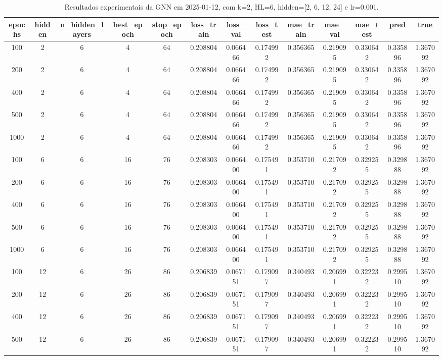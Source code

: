 \begin{table}[h]
\centering
\caption{Resultados experimentais da GNN em 2025-01-12, com k=2, HL=6, hidden=[2, 6, 12, 24] e lr=0.001.}
\label{tab:gnn_results_k2_hl6_d20250112}
\begin{tabular}{ccccccccccccc}
\toprule
epochs & hidden & n\_hidden\_layers & best\_epoch & stop\_epoch & loss\_train & loss\_val & loss\_test & mae\_train & mae\_val & mae\_test & pred & true \\
\midrule
100 & 2 & 6 & 4 & 64 & 0.208804 & 0.066466 & 0.174992 & 0.356365 & 0.219095 & 0.330642 & 0.335896 & 1.367092 \\
200 & 2 & 6 & 4 & 64 & 0.208804 & 0.066466 & 0.174992 & 0.356365 & 0.219095 & 0.330642 & 0.335896 & 1.367092 \\
400 & 2 & 6 & 4 & 64 & 0.208804 & 0.066466 & 0.174992 & 0.356365 & 0.219095 & 0.330642 & 0.335896 & 1.367092 \\
500 & 2 & 6 & 4 & 64 & 0.208804 & 0.066466 & 0.174992 & 0.356365 & 0.219095 & 0.330642 & 0.335896 & 1.367092 \\
1000 & 2 & 6 & 4 & 64 & 0.208804 & 0.066466 & 0.174992 & 0.356365 & 0.219095 & 0.330642 & 0.335896 & 1.367092 \\
100 & 6 & 6 & 16 & 76 & 0.208303 & 0.066400 & 0.175491 & 0.353710 & 0.217092 & 0.329255 & 0.329888 & 1.367092 \\
200 & 6 & 6 & 16 & 76 & 0.208303 & 0.066400 & 0.175491 & 0.353710 & 0.217092 & 0.329255 & 0.329888 & 1.367092 \\
400 & 6 & 6 & 16 & 76 & 0.208303 & 0.066400 & 0.175491 & 0.353710 & 0.217092 & 0.329255 & 0.329888 & 1.367092 \\
500 & 6 & 6 & 16 & 76 & 0.208303 & 0.066400 & 0.175491 & 0.353710 & 0.217092 & 0.329255 & 0.329888 & 1.367092 \\
1000 & 6 & 6 & 16 & 76 & 0.208303 & 0.066400 & 0.175491 & 0.353710 & 0.217092 & 0.329255 & 0.329888 & 1.367092 \\
100 & 12 & 6 & 26 & 86 & 0.206839 & 0.067151 & 0.179097 & 0.340493 & 0.206991 & 0.322232 & 0.299510 & 1.367092 \\
200 & 12 & 6 & 26 & 86 & 0.206839 & 0.067151 & 0.179097 & 0.340493 & 0.206991 & 0.322232 & 0.299510 & 1.367092 \\
400 & 12 & 6 & 26 & 86 & 0.206839 & 0.067151 & 0.179097 & 0.340493 & 0.206991 & 0.322232 & 0.299510 & 1.367092 \\
500 & 12 & 6 & 26 & 86 & 0.206839 & 0.067151 & 0.179097 & 0.340493 & 0.206991 & 0.322232 & 0.299510 & 1.367092 \\

\end{tabular}
\end{table}
